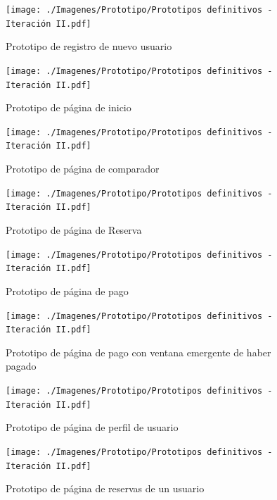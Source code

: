 \begin{figure}[H]
      \centering
      \texttt{[image: ./Imagenes/Prototipo/Prototipos definitivos - Iteración II.pdf]}
      \caption{Prototipo de registro de nuevo usuario}
      \label{fig:prot2_reg}
\end{figure}

\begin{figure}[H]
      \centering
      \texttt{[image: ./Imagenes/Prototipo/Prototipos definitivos - Iteración II.pdf]}
      \caption{Prototipo de página de inicio}
      \label{fig:prot2_inicio}
\end{figure}

\begin{figure}[H]
      \centering
      \texttt{[image: ./Imagenes/Prototipo/Prototipos definitivos - Iteración II.pdf]}
      \caption{Prototipo de página de comparador}
      \label{fig:prot2_comp}
\end{figure}

\begin{figure}[H]
    \centering
    \texttt{[image: ./Imagenes/Prototipo/Prototipos definitivos - Iteración II.pdf]}
    \caption{Prototipo de página de Reserva}
    \label{fig:prot2_reser}
\end{figure}

\begin{figure}[H]
    \centering
    \texttt{[image: ./Imagenes/Prototipo/Prototipos definitivos - Iteración II.pdf]}
    \caption{Prototipo de página de pago}
    \label{fig:prot2_pago}
\end{figure}

\begin{figure}[H]
    \centering
    \texttt{[image: ./Imagenes/Prototipo/Prototipos definitivos - Iteración II.pdf]}
    \caption{Prototipo de página de pago con ventana emergente de haber pagado}
    \label{fig:prot2_pago_popup}
\end{figure}

\begin{figure}[H]
    \centering
    \texttt{[image: ./Imagenes/Prototipo/Prototipos definitivos - Iteración II.pdf]}
    \caption{Prototipo de página de perfil de usuario}
    \label{fig:prot2_perfil}
\end{figure}

\begin{figure}[H]
    \centering
    \texttt{[image: ./Imagenes/Prototipo/Prototipos definitivos - Iteración II.pdf]}
    \caption{Prototipo de página de reservas de un usuario}
    \label{fig:prot2_reservas_usuario}
\end{figure}

